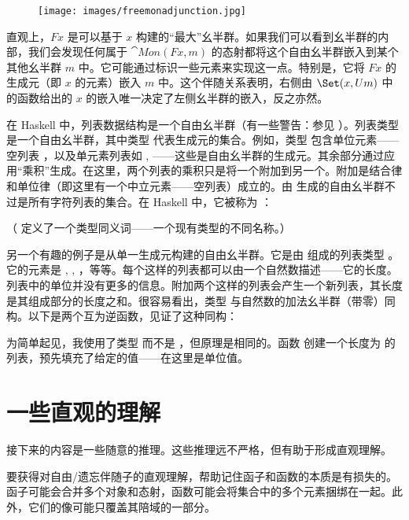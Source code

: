 \begin{figure}[H]
  \centering
  \texttt{[image: images/freemonadjunction.jpg]}
\end{figure}

\noindent
直观上，$F x$ 是可以基于 $x$ 构建的“最大”幺半群。如果我们可以看到幺半群的内部，我们会发现任何属于 $\cat{Mon}(F x, m)$ 的态射都将这个自由幺半群嵌入到某个其他幺半群 $m$ 中。它可能通过标识一些元素来实现这一点。特别是，它将 $F x$ 的生成元（即 $x$ 的元素）嵌入 $m$ 中。这个伴随关系表明，右侧由 $\Set(x, U m)$ 中的函数给出的 $x$ 的嵌入唯一决定了左侧幺半群的嵌入，反之亦然。

在 Haskell 中，列表数据结构是一个自由幺半群（有一些警告：参见 ）。列表类型 \code{{[}a{]}} 是一个自由幺半群，其中类型  代表生成元的集合。例如，类型 \code{{[}Char{]}} 包含单位元素——空列表 \code{{[}{]}}，以及单元素列表如 \code{{[}'a'{]}}, \code{{[}'b'{]}}——这些是自由幺半群的生成元。其余部分通过应用“乘积”生成。在这里，两个列表的乘积只是将一个附加到另一个。附加是结合律和单位律（即这里有一个中立元素——空列表）成立的。由  生成的自由幺半群不过是所有字符列表的集合。在 Haskell 中，它被称为 ：

（ 定义了一个类型同义词——一个现有类型的不同名称。）

另一个有趣的例子是从单一生成元构建的自由幺半群。它是由 \code{()} 组成的列表类型 \code{{[}(){]}}。它的元素是 \code{{[}{]}}, \code{{[}(){]}}, \code{{[}(), (){]}}，等等。每个这样的列表都可以由一个自然数描述——它的长度。列表中的单位并没有更多的信息。附加两个这样的列表会产生一个新列表，其长度是其组成部分的长度之和。很容易看出，类型 \code{{[}(){]}} 与自然数的加法幺半群（带零）同构。以下是两个互为逆函数，见证了这种同构：

为简单起见，我使用了类型  而不是 ，但原理是相同的。函数  创建一个长度为  的列表，预先填充了给定的值——在这里是单位值。

\section{一些直观的理解}

接下来的内容是一些随意的推理。这些推理远不严格，但有助于形成直观理解。

要获得对自由/遗忘伴随子的直观理解，帮助记住函子和函数的本质是有损失的。函子可能会合并多个对象和态射，函数可能会将集合中的多个元素捆绑在一起。此外，它们的像可能只覆盖其陪域的一部分。

